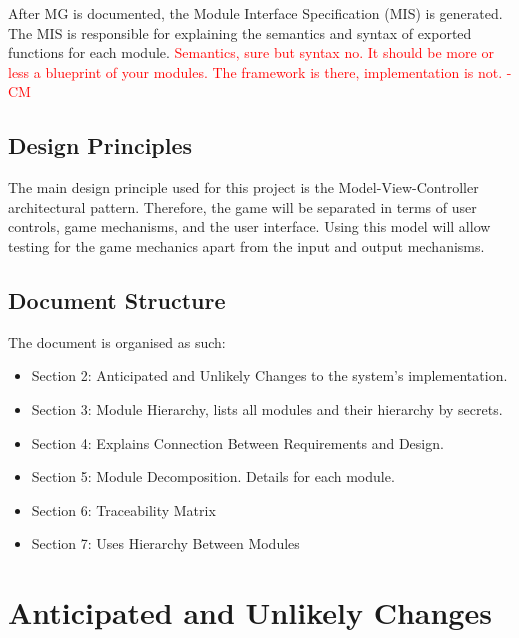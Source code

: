 \documentclass[12pt, titlepage]{article}
\begin{document}
  After MG is documented, the Module Interface Specification (MIS) is generated. The MIS is responsible for explaining the semantics and syntax of exported functions for each module.
  \textcolor{red}{Semantics, sure but syntax no. It should be more or less a blueprint of your modules. The framework is there, implementation is not. - CM} \\

\subsection{Design Principles}

The main design principle used for this project is the Model-View-Controller architectural pattern. Therefore, the game will be separated in terms of user controls, game mechanisms, and the user interface. Using this model will allow testing for the game mechanics apart from the input and output mechanisms.

\subsection{Document Structure}

The document is organised as such:

\begin{itemize}

\item Section 2: Anticipated and Unlikely Changes to the system's implementation.

\item Section 3: Module Hierarchy, lists all modules and their hierarchy by secrets.

\item Section 4: Explains Connection Between Requirements and Design.

\item Section 5: Module Decomposition. Details for each module.

\item Section 6: Traceability Matrix

\item Section 7: Uses Hierarchy Between Modules

\end{itemize}

\section{Anticipated and Unlikely Changes} \label{SecChange}
\end{document}
